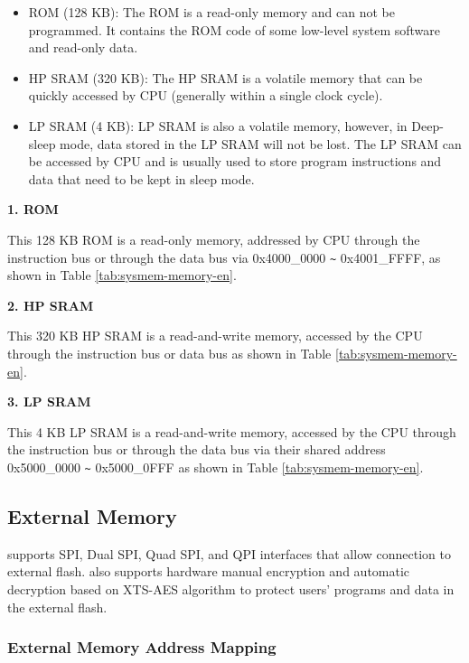 \documentclass[main\_\_EN.tex]{subfiles}
\begin{document}
\begin{itemize}
    \item ROM (128 KB): The ROM is a read-only memory and can not be programmed. It contains the ROM code of some low-level system software and read-only data.
    \item HP SRAM (320 KB): The HP SRAM is a volatile memory that can be quickly accessed by CPU (generally within a single clock cycle).
    \item LP SRAM (4 KB): LP SRAM is also a volatile memory, however, in Deep-sleep mode, data stored in the LP SRAM will not be lost. The LP SRAM can be accessed by CPU and is usually used to store program instructions and data that need to be kept in sleep mode.
\end{itemize}

{\bfseries 1. ROM}

This 128 KB ROM is a read-only memory, addressed by CPU through the instruction bus or through the data bus via 0x4000\_0000 \verb+~+ 0x4001\_FFFF, as shown in Table \ref{tab:sysmem-memory-en}.


{\bfseries  2. HP SRAM}
\label{other:sysmem-internal-sram-0}

This 320 KB HP SRAM is a read-and-write memory, accessed by the CPU through the instruction bus or data bus as shown in Table  \ref{tab:sysmem-memory-en}.


{\bfseries 3. LP SRAM}

This 4 KB LP SRAM is a read-and-write memory, accessed by the CPU through the instruction bus or through the data bus via their shared address 0x5000\_0000 \verb+~+ 0x5000\_0FFF as shown in Table \ref{tab:sysmem-memory-en}.



\subsection{External Memory} 
\label{para:sysmem-external-memory}

\chipname{} supports SPI, Dual SPI, Quad SPI, and QPI interfaces that allow connection to external flash. 
\chipname{} also supports hardware manual encryption and automatic decryption based on XTS-AES algorithm to protect users' programs and data in the external flash.


\subsubsection{External Memory Address Mapping}
\end{document}
